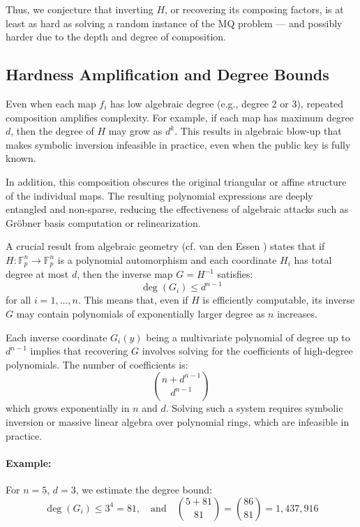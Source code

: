 \documentclass[12pt]{article}
\begin{document}
Thus, we conjecture that inverting \( H \), or recovering its composing factors, is at least as hard as solving a random instance of the MQ problem — and possibly harder due to the depth and degree of composition.

\subsection*{Hardness Amplification and Degree Bounds}

Even when each map \( f_i \) has low algebraic degree (e.g., degree 2 or 3), repeated composition amplifies complexity. For example, if each map has maximum degree \( d \), then the degree of \( H \) may grow as \( d^k \). This results in algebraic blow-up that makes symbolic inversion infeasible in practice, even when the public key is fully known.

In addition, this composition obscures the original triangular or affine structure of the individual maps. The resulting polynomial expressions are deeply entangled and non-sparse, reducing the effectiveness of algebraic attacks such as Gröbner basis computation or relinearization.

A crucial result from algebraic geometry (cf. van den Essen \cite{Essen2000}) states that if \( H: \mathbb{F}_p^n \to \mathbb{F}_p^n \) is a polynomial automorphism and each coordinate \( H_i \) has total degree at most \( d \), then the inverse map \( G = H^{-1} \) satisfies:
\[
\deg(G_i) \le d^{n - 1}
\]
for all \( i = 1, \dots, n \). This means that, even if \( H \) is efficiently computable, its inverse \( G \) may contain polynomials of exponentially larger degree as \( n \) increases.

Each inverse coordinate \( G_i(y) \) being a multivariate polynomial of degree up to \( d^{n-1} \) implies that recovering \( G \) involves solving for the coefficients of high-degree polynomials. The number of coefficients is:
\[
\binom{n + d^{n-1}}{d^{n-1}}
\]
which grows exponentially in \( n \) and \( d \). Solving such a system requires symbolic inversion or massive linear algebra over polynomial rings, which are infeasible in practice.

\paragraph{Example:} For \( n = 5 \), \( d = 3 \), we estimate the degree bound:
\[
\deg(G_i) \le 3^4 = 81, \quad \text{and} \quad \binom{5 + 81}{81} = \binom{86}{81} = 1,437,916
\]
\end{document}
